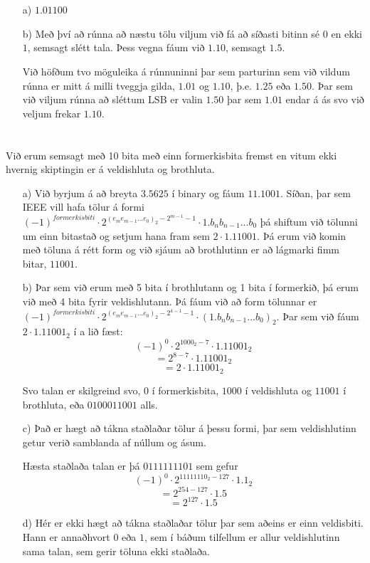 \documentclass{article}
\begin{document}
	\section{}
	\begin{itemize}
		\item[a)] $1.01100$
		\item[b)] Með því að rúnna að næstu tölu viljum við fá að síðasti 
			bitinn sé $0$ en ekki $1$, semsagt slétt tala. Þess vegna 
			fáum við $1.10$, semsagt $1.5$.

			Við höfðum tvo möguleika á rúnnuninni þar sem parturinn sem við 
			vildum rúnna er mitt á milli tveggja gilda, $1.01$ og $1.10$, þ.e. 
			$1.25$ eða $1.50$. Þar sem við viljum rúnna að sléttum LSB er 
			valin $1.50$ þar sem $1.01$ endar á ás svo við veljum frekar 
			$1.10$.
	\end{itemize}

	\section{}
		Við erum semsagt með 10 bita með einn formerkisbita fremst en vitum 
		ekki hvernig skiptingin er á veldishluta og brothluta.
	\begin{itemize}
		\item[a)] Við byrjum á að breyta $3.5625$ í binary og fáum 
			$11.1001$. Síðan, þar sem IEEE vill hafa tölur á formi 
			$(-1)^{formerkisbiti}\cdot 2^{(e_me_{m-1}...e_0)_2 - 2^{m-1}-1}\cdot1.b_nb_{n-1}...b_0$ þá shiftum við tölunni um einn bitastað 
			og setjum hana fram sem $2 \cdot 1.11001$. Þá erum við komin 
			með töluna á rétt form og við sjáum að brothlutinn er að 
			lágmarki fimm bitar, $11001$.
		\item[b)] Þar sem við erum með 5 bita í brothlutann og 1 bita í 
			formerkið, þá erum við með 4 bita fyrir veldishlutann. Þá 
			fáum við að form tölunnar er $(-1)^{formerkisbiti}\cdot2^{(e_me_{m-1}...e_0)_2 - 2^{4-1}-1} 
			\cdot (1.b_nb_{n-1}...b_0)_2$. Þar sem við fáum $2 \cdot 1.11001_2$ 
			í a lið fæst:
			\[(-1)^0\cdot2^{1000_2 - 7} \cdot 1.11001_2\]
			\[= 2^{8-7} \cdot 1.11001_2\]
			\[= 2 \cdot 1.11001_2\]

			Svo talan er skilgreind svo, 0 í formerkisbita, $1000$ í 
			veldishluta og $11001$ í brothluta, eða $0100011001$ alls.
		\item[c)] Það er hægt að tákna staðlaðar tölur á þessu formi, þar 
			sem veldishlutinn getur verið samblanda af núllum og ásum.

			Hæsta staðlaða talan er þá $0111111101$ sem gefur 
			\[(-1)^0\cdot2^{11111110_2 - 127} \cdot 1.1_2\]
			\[= 2^{254 - 127} \cdot 1.5\]
			\[= 2^{127} \cdot 1.5\]
		\item[d)] Hér er ekki hægt að tákna staðlaðar tölur þar sem aðeins 
			er einn veldisbiti. Hann er annaðhvort $0$ eða $1$, sem í 
			báðum tilfellum er allur veldishlutinn sama talan, sem gerir 
			töluna ekki staðlaða.
	\end{itemize}
\end{document}
